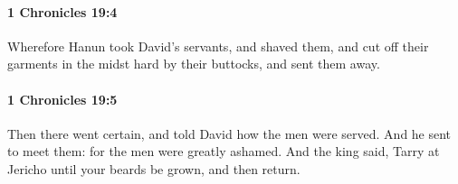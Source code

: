 		\paragraph{1 Chronicles 19:4} %
			\label{1CHRONICLES-19-4}

			Wherefore Hanun took David’s servants, and shaved them, and cut off their garments in the midst hard by their buttocks, and sent them away.


		\paragraph{1 Chronicles 19:5} %
			\label{1CHRONICLES-19-5}

			Then there went certain, and told David how the men were served. And he sent to meet them: for the men were greatly ashamed. And the king said, Tarry at Jericho until your beards be grown, and then return.


